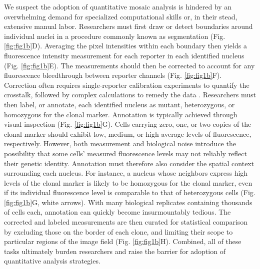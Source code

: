 We suspect the adoption of quantitative mosaic analysis is hindered by an overwhelming demand for specialized computational skills or, in their stead, extensive manual labor. Researchers must first draw or detect boundaries around individual nuclei in a procedure commonly known as segmentation (Fig. \ref{fig:fig1b}D). Averaging the pixel intensities within each boundary then yields a fluorescence intensity measurement for each reporter in each identified nucleus (Fig. \ref{fig:fig1b}E). The measurements should then be corrected to account for any fluorescence bleedthrough between reporter channels (Fig. \ref{fig:fig1b}F). Correction often requires single-reporter calibration experiments to quantify the crosstalk, followed by complex calculations to remedy the data \cite{Bacia2012,Elangovan2003}. Researchers must then label, or annotate, each identified nucleus as mutant, heterozygous, or homozygous for the clonal marker. Annotation is typically achieved through visual inspection (Fig. \ref{fig:fig1b}G). Cells carrying zero, one, or two copies of the clonal marker should exhibit low, medium, or high average levels of fluorescence, respectively. However, both measurement and biological noise introduce the possibility that some cells’ measured fluorescence levels may not reliably reflect their genetic identity. Annotation must therefore also consider the spatial context surrounding each nucleus. For instance, a nucleus whose neighbors express high levels of the clonal marker is likely to be homozygous for the clonal marker, even if its individual fluorescence level is comparable to that of heterozygous cells (Fig. \ref{fig:fig1b}G, white arrows). With many biological replicates containing thousands of cells each, annotation can quickly become insurmountably tedious. The corrected and labeled measurements are then curated for statistical comparison by excluding those on the border of each clone, and limiting their scope to particular regions of the image field (Fig. \ref{fig:fig1b}H). Combined, all of these tasks ultimately burden researchers and raise the barrier for adoption of quantitative analysis strategies. 


